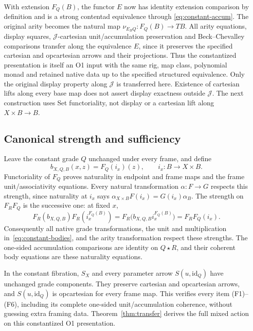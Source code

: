 \documentclass[11pt,a4paper]{article}
\theoremstyle{definition}
\newcommand{\J}{\mathcal J}
\newcommand{\id}{\mathrm{id}}
\begin{document}
With extension $F_Q(B)$, the functor $E$ now has identity extension
comparison by definition and is a strong contentad equivalence through
\eqref{eq:constant-accum}. The original arity becomes the natural map
$\nu_{E_BQ}:F_Q(B)\to TB$. All arity equations, display squares,
$\J$-cartesian unit/accumulation preservation and Beck--Chevalley
comparisons transfer along the equivalence $E$, since it preserves the
specified cartesian and opcartesian arrows and their projections.
Thus the constantized presentation is itself an O1 input with the same
rig, map class, polynomial monad and retained native data up to the
specified structured equivalence.
Only the original display property along $\J$ is transferred here.
Existence of cartesian lifts along every base map does not assert display
exactness outside $\J$. The next construction uses Set functoriality,
not display or a cartesian lift along $X\times B\to B$.

\subsection{Canonical strength and sufficiency}
Leave the constant grade $Q$ unchanged under every frame, and define
\begin{equation}\label{eq:constantized-strength}
 b_{X,Q,B}(x,z)=F_Q(i_x)(z),\qquad i_x:B\to X\times B.
\end{equation}
Functoriality of $F_Q$ proves naturality in endpoint and frame maps and
the frame unit/associativity equations. Every natural transformation
$\alpha:F\to G$ respects this strength, since naturality at $i_x$ says
$\alpha_{X\times B}F(i_x)=G(i_x)\alpha_B$.
The strength on $F_RF_Q$ is the successive one: at fixed $x$,
\[
 F_R(b_{X,Q,B})F_R(i_x^{F_Q(B)})
   =F_R\bigl(b_{X,Q,B}i_x^{F_Q(B)}\bigr)
   =F_RF_Q(i_x).
\]
Consequently all native grade transformations, the unit and multiplication
in~\eqref{eq:constant-bodies}, and the arity transformation respect these
strengths. The one-sided accumulation comparisons are identity on
$Q\star R$, and their coherent body equations are these naturality
equations.

In the constant fibration, $S_X$ and every parameter arrow
$S(u,\id_Q)$ have unchanged grade components. They preserve cartesian and
opcartesian arrows, and $S(u,\id_Q)$ is opcartesian for every frame map.
This verifies every item (F1)--(F6), including its complete one-sided
unit/accumulation coherence, without guessing extra framing data.
Theorem~\ref{thm:transfer} derives the full mixed action on this constantized
O1 presentation.
\end{document}
